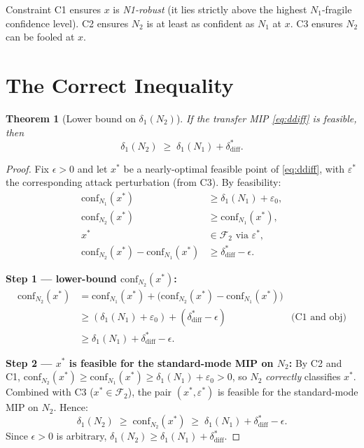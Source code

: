 \documentclass[12pt]{article}
\theoremstyle{definition}
\theoremstyle{plain}
\newtheorem{theorem}{Theorem}[section]
\theoremstyle{remark}
\newcommand{\conf}[2]{\mathrm{conf}_{#1}(#2)}
\newcommand{\dN}[1]{\delta_1(N_{#1})}
\newcommand{\ddiff}{\delta_{\mathrm{diff}}^{*}}
\newcommand{\Ffool}[1]{\mathcal{F}_{#1}}
\begin{document}
\noindent
Constraint C1 ensures $x$ is \emph{N1-robust} (it lies strictly above the
highest $N_1$-fragile confidence level). C2 ensures $N_2$ is at least as
confident as $N_1$ at $x$. C3 ensures $N_2$ can be fooled at $x$.

\section{The Correct Inequality}\label{sec:correct}

\begin{theorem}[Lower bound on $\dN{2}$]\label{thm:correct}
If the transfer MIP \eqref{eq:ddiff} is feasible, then
\[
  \boxed{\dN{2} \;\geq\; \dN{1} + \ddiff.}
\]
\end{theorem}

\begin{proof}
Fix $\epsilon>0$ and let $x^*$ be a nearly-optimal feasible point of
\eqref{eq:ddiff}, with $\varepsilon^*$ the corresponding attack
perturbation (from C3). By feasibility:
\begin{align}
  \conf{N_1}{x^*} &\geq \dN{1}+\varepsilon_0, \tag{C1}\\
  \conf{N_2}{x^*} &\geq \conf{N_1}{x^*},       \tag{C2}\\
  x^* &\in\Ffool{2} \text{ via } \varepsilon^*, \tag{C3}\\
  \conf{N_2}{x^*}-\conf{N_1}{x^*} &\geq \ddiff-\epsilon. \tag{obj}
\end{align}

\textbf{Step 1 — lower-bound $\conf{N_2}{x^*}$:}
\begin{align*}
  \conf{N_2}{x^*}
  &= \conf{N_1}{x^*}+\bigl(\conf{N_2}{x^*}-\conf{N_1}{x^*}\bigr)\\
  &\geq (\dN{1}+\varepsilon_0)+(\ddiff-\epsilon)
  &\text{(C1 and obj)}\\
  &\geq \dN{1}+\ddiff-\epsilon.
\end{align*}

\textbf{Step 2 — $x^*$ is feasible for the standard-mode MIP on $N_2$:}
By C2 and C1,
$\conf{N_2}{x^*}\geq\conf{N_1}{x^*}\geq\dN{1}+\varepsilon_0>0$,
so $N_2$ \emph{correctly} classifies $x^*$.
Combined with C3 ($x^*\in\Ffool{2}$), the pair $(x^*,\varepsilon^*)$
is feasible for the standard-mode MIP on $N_2$. Hence:
\[
  \dN{2}
  \;\geq\;\conf{N_2}{x^*}
  \;\geq\;\dN{1}+\ddiff-\epsilon.
\]
Since $\epsilon>0$ is arbitrary, $\dN{2}\geq\dN{1}+\ddiff$.
\end{proof}
\end{document}
